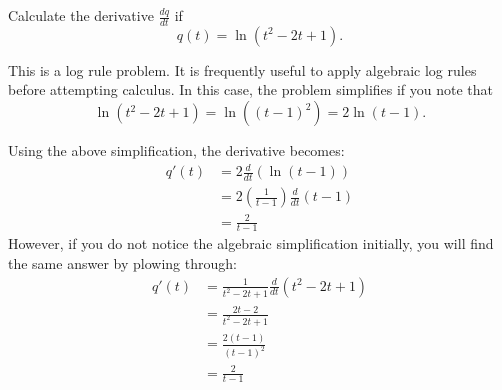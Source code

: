 \documentclass{ximera}
\author{Emma Smith Zbarsky}
\begin{document}
\begin{exercise}

Calculate the derivative $\frac{dq}{dt}$ if \[q(t) = \ln(t^2-2t+1).\]


\begin{hint}
This is a log rule problem. It is frequently useful to apply algebraic
log rules before attempting calculus. In this case, the problem
simplifies if you note that
\[\ln(t^2-2t+1) = \ln\left((t-1)^2\right) = 2\ln(t-1).\]
\end{hint}


\begin{hint}
Using the above simplification, the derivative becomes: \begin{align*}
q'(t) &= 2\frac{d}{dt}\left(\ln(t-1)\right) \\
&= 2 \left(\frac{1}{t-1}\right)\frac{d}{dt}\left(t-1\right) \\
&= \frac{2}{t-1}
\end{align*} However, if you do not notice the algebraic
simplification initially, you will find the same answer by plowing
through: \begin{align*}
q'(t) &= \frac{1}{t^2-2t+1}\frac{d}{dt}\left(t^2-2t+1\right) \\
&= \frac{2t-2}{t^2-2t+1} \\
&= \frac{2(t-1)}{(t-1)^2} \\
&= \frac{2}{t-1}
\end{align*}
\end{hint}


\begin{multipleChoice}
\end{multipleChoice}

\end{exercise}
\end{document}
